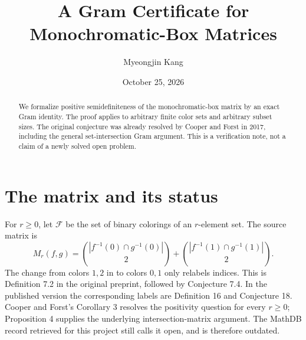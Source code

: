 \documentclass[11pt]{article}
\title{A Gram Certificate for Monochromatic-Box Matrices}
\author{Myeongjin Kang}
\date{October 25, 2026}
\begin{document}
\maketitle
\begin{abstract}
We formalize positive semidefiniteness of the monochromatic-box matrix by an exact Gram identity. The proof applies to arbitrary finite color sets and arbitrary subset sizes. The original conjecture was already resolved by Cooper and Forst in 2017, including the general set-intersection Gram argument. This is a verification note, not a claim of a newly solved open problem.
\end{abstract}
\section{The matrix and its status}
For $r\ge0$, let $\mathcal F$ be the set of binary colorings of an $r$-element set. The source matrix is
\[
M_r(f,g)=\binom{|f^{-1}(0)\cap g^{-1}(0)|}{2}
 +\binom{|f^{-1}(1)\cap g^{-1}(1)|}{2}.
\]
The change from colors $1,2$ in \cite{CFP} to colors $0,1$ only relabels indices. This is Definition 7.2 in the original preprint, followed by Conjecture 7.4. In the published version the corresponding labels are Definition 16 and Conjecture 18. Cooper and Forst's Corollary 3 \cite{CF} resolves the positivity question for every $r\ge0$; Proposition 4 supplies the underlying intersection-matrix argument. The MathDB record retrieved for this project still calls it open, and is therefore outdated.
\end{document}
